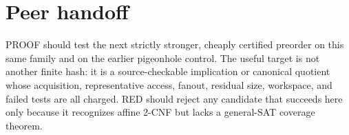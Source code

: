 \documentclass[11pt]{article}
\begin{document}
\section{Peer handoff}
PROOF should test the next strictly stronger, cheaply certified preorder on
this same family and on the earlier pigeonhole control.  The useful target is
not another finite hash: it is a source-checkable implication or canonical
quotient whose acquisition, representative access, fanout, residual size,
workspace, and failed tests are all charged.  RED should reject any candidate
that succeeds here only because it recognizes affine 2-CNF but lacks a
general-SAT coverage theorem.

\end{document}
